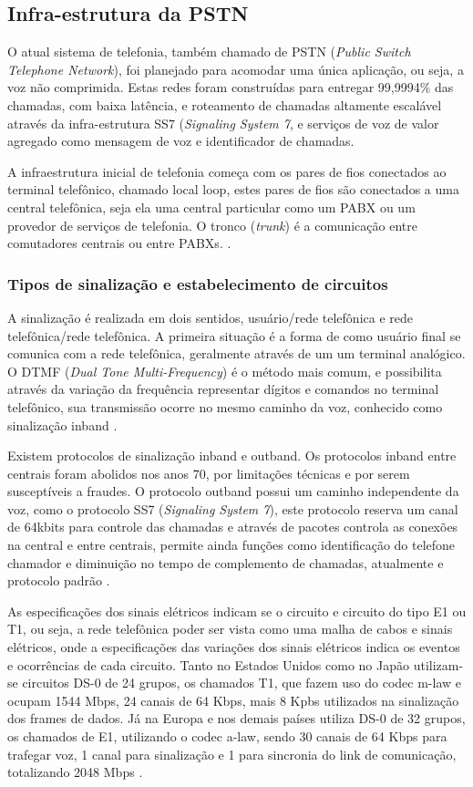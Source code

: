 \subsection{Infra-estrutura da PSTN}
O atual sistema de telefonia, também chamado de PSTN (\textit{Public Switch Telephone Network}), foi planejado para acomodar uma única aplicação, ou seja, a voz não comprimida. Estas redes foram construídas para entregar 99,9994$ \% $ das chamadas, com baixa latência, e roteamento de chamadas altamente escalável através da infra-estrutura SS7 (\textit{Signaling System 7}, e serviços de voz de valor agregado como mensagem de voz e identificador de chamadas.

A infraestrutura inicial de telefonia começa com os pares de fios conectados ao terminal telefônico, chamado local loop, estes pares de fios são conectados a uma central telefônica, seja ela uma central particular como um PABX ou um provedor de serviços de telefonia. O tronco (\textit{trunk}) é a comunicação entre comutadores centrais ou entre PABXs. \cite{eduardotude2014}.

\subsubsection{Tipos de sinalização e estabelecimento de circuitos}
A sinalização é realizada em dois sentidos, usuário/rede telefônica e rede telefônica/rede telefônica. A primeira situação é a forma de como usuário final se comunica com a rede telefônica, geralmente através de um um terminal analógico. O DTMF (\textit{Dual Tone Multi-Frequency}) é o método mais comum, e possibilita através da variação da frequência representar dígitos e comandos no terminal telefônico, sua transmissão ocorre no mesmo caminho da voz, conhecido como sinalização inband \cite{thiagowinkler2007}.

Existem protocolos de sinalização inband e outband. Os protocolos inband entre centrais foram abolidos nos anos 70, por limitações técnicas e por serem susceptíveis a fraudes. O protocolo outband possui um caminho independente da voz, como o protocolo SS7 (\textit{Signaling System 7}), este protocolo  reserva um canal de 64kbits para controle das chamadas e através de pacotes controla as conexões na central e entre centrais, permite ainda funções como identificação do telefone chamador e diminuição no tempo de complemento de chamadas, atualmente e protocolo padrão \cite{eduardomaronasmonks2006}.

As especificações dos sinais elétricos indicam se o circuito e circuito do tipo E1 ou T1, ou seja, a rede telefônica poder ser vista como uma malha de cabos e sinais elétricos, onde a especificações das variações dos sinais elétricos indica os eventos e ocorrências de cada circuito. Tanto no Estados Unidos como no Japão utilizam-se circuitos DS-0 de 24 grupos, os chamados T1, que fazem uso do codec m-law e ocupam 1544 Mbps, 24 canais de 64 Kbps, mais 8 Kpbs utilizados na sinalização dos frames de dados. Já na Europa e nos demais países utiliza DS-0 de 32 grupos, os chamados de E1, utilizando o codec a-law, sendo 30 canais de 64 Kbps para trafegar voz, 1 canal para sinalização e 1 para sincronia do link de comunicação, totalizando 2048 Mbps \cite{alexandrekeller2014}.

